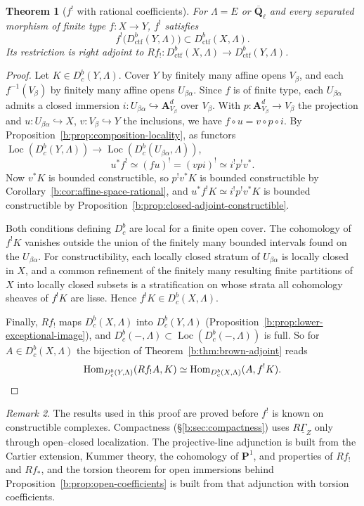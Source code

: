 \documentclass[11pt,a4paper]{article}
\numberwithin{equation}{section}
\newtheorem{theorem}{Theorem}[section]
\theoremstyle{definition}
\theoremstyle{remark}
\newtheorem{remark}[theorem]{Remark}
\newcommand{\Dbc}{D^b_c}
\newcommand{\Loc}{\operatorname{Loc}}
\newcommand{\Qbar}{\overline{\mathbf Q}_\ell}
\newcommand{\Hom}{\operatorname{Hom}}
\newcommand{\Dctf}{D^b_{\mathrm{ctf}}}
\begin{document}
\begin{theorem}[$f^!$ with rational coefficients]\label{b:thm:restriction}
For $\Lambda=E$ or $\Qbar$ and every separated morphism of finite type
$f:X\to Y$, $f^!$ satisfies
\[
 f^!\bigl(\Dctf(Y,\Lambda)\bigr)\subset\Dctf(X,\Lambda).
\]
Its restriction is right adjoint to
$Rf_!:\Dctf(X,\Lambda)\to\Dctf(Y,\Lambda)$.
\end{theorem}
\begin{proof}
Let $K\in \Dbc(Y,\Lambda)$. Cover $Y$ by finitely many affine opens
$V_\beta$, and each $f^{-1}(V_\beta)$ by finitely many affine opens
$U_{\beta\alpha}$. Since $f$ is of finite type, each $U_{\beta\alpha}$
admits a closed immersion $i:U_{\beta\alpha}\hookrightarrow\mathbf A^d_{V_\beta}$
over $V_\beta$. With $p:\mathbf A^d_{V_\beta}\to V_\beta$ the projection
and $u:U_{\beta\alpha}\hookrightarrow X$, $v:V_\beta\hookrightarrow Y$ the
inclusions, we have $f\circ u=v\circ p\circ i$. By
Proposition~\ref{b:prop:composition-locality}, as functors
$\Loc(\Dbc(Y,\Lambda))\to\Loc(\Dbc(U_{\beta\alpha},\Lambda))$,
\[
 u^*f^!\simeq (fu)^!=(vpi)^!\simeq i^!p^!v^*.
\]
Now $v^*K$ is bounded constructible, so $p^!v^*K$ is bounded
constructible by Corollary~\ref{b:cor:affine-space-rational}, and
$u^*f^!K\simeq i^!p^!v^*K$ is bounded constructible by
Proposition~\ref{b:prop:closed-adjoint-constructible}.

Both conditions defining $\Dbc$ are local for a finite open cover. The
cohomology of $f^!K$ vanishes outside the union of the finitely many
bounded intervals found on the $U_{\beta\alpha}$. For constructibility,
each locally closed stratum of $U_{\beta\alpha}$ is locally closed in
$X$, and a common refinement of the finitely many resulting finite
partitions of $X$ into locally closed subsets is a stratification on
whose strata all cohomology sheaves of $f^!K$ are lisse. Hence
$f^!K\in \Dbc(X,\Lambda)$.

Finally, $Rf_!$ maps $\Dbc(X,\Lambda)$ into $\Dbc(Y,\Lambda)$
(Proposition~\ref{b:prop:lower-exceptional-image}), and
$\Dbc(-,\Lambda)\subset\Loc(\Dbc(-,\Lambda))$ is full. So for
$A\in \Dbc(X,\Lambda)$ the bijection of Theorem~\ref{b:thm:brown-adjoint}
reads
\[
 \Hom_{\Dbc(Y,\Lambda)}(Rf_!A,K)
   \simeq\Hom_{\Dbc(X,\Lambda)}(A,f^!K).\qedhere
\]
\end{proof}

\begin{remark}
The results used in this proof are proved before $f^!$ is known on
constructible complexes. Compactness (\S\ref{b:sec:compactness}) uses
$R\underline\Gamma_Z$ only through open--closed localization. The
projective-line adjunction is built from the Cartier extension, Kummer
theory, the cohomology of $\mathbf P^1$, and properties of $Rf_!$ and
$Rf_*$, and the torsion theorem for open immersions behind
Proposition~\ref{b:prop:open-coefficients} is built from that
adjunction with torsion coefficients.
\end{remark}
\end{document}
